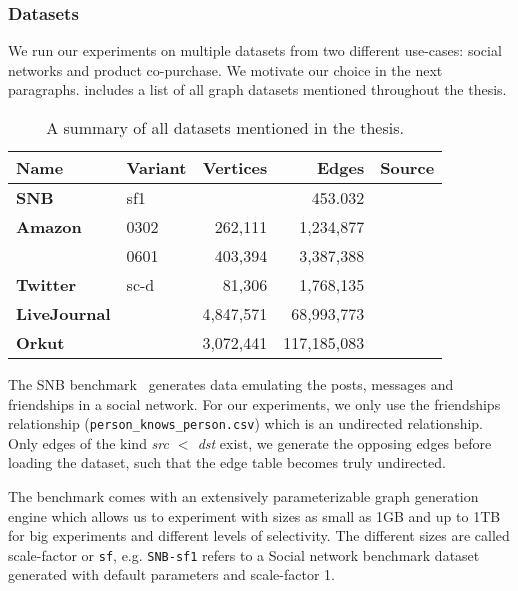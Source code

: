 \subsubsection{Datasets}
We run our experiments on multiple datasets from two different use-cases: social networks and product co-purchase.
We motivate our choice in the next paragraphs.
 includes a list of all graph datasets mentioned throughout the thesis.

\begin{table}[]
    \centering
    \begin{tabular}{llrrl} \toprule
    Name    & Variant              &  Vertices   & Edges          & Source          \\ \midrule
    \textbf{SNB}         & sf1     &             &  453.032       & \cite{snb}      \\
    \textbf{Amazon}      & 0302    & 262,111     &  1,234,877     & \cite{snapnets} \\
    & 0601    & 403,394     &  3,387,388     & \cite{snapnets} \\
    \textbf{Twitter}     & sc-d    & 81,306      &  1,768,135     & \cite{snapnets} \\
    \textbf{LiveJournal} &         & 4,847,571   & 68,993,773     & \cite{snapnets} \\
    \textbf{Orkut}       &         & 3,072,441   & 117,185,083    & \cite{snapnets} \\ \bottomrule
    \end{tabular}
    \caption{A summary of all datasets mentioned in the thesis.}
    \label{table:datasets}
\end{table}

The SNB benchmark~\cite{snb} generates data emulating the posts, messages and friendships in a social network.
For our experiments, we only use the friendships relationship (\texttt{person\_knows\_person.csv}) which is an undirected relationship.
Only edges of the kind \textit{src $<$ dst} exist, we generate the opposing edges before loading the dataset, such
that the edge table becomes truly undirected.

The benchmark comes with an extensively parameterizable graph generation engine
which allows us to experiment with sizes as small as 1GB and up to 1TB for big experiments and different levels of selectivity.
The different sizes are called scale-factor or \texttt{sf}, e.g. \texttt{SNB-sf1} refers to a Social network benchmark dataset generated with
default parameters and scale-factor 1.

